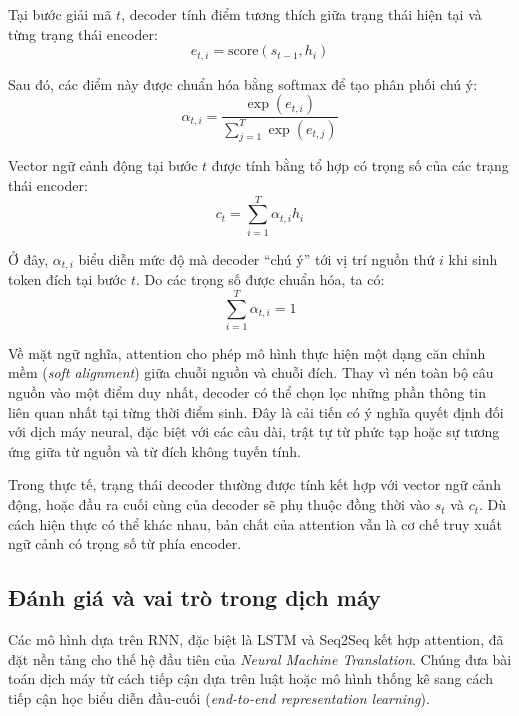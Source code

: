 \documentclass[a4paper,12pt,twoside]{report}
\begin{document}
Tại bước giải mã $t$, decoder tính điểm tương thích giữa trạng thái hiện tại và từng trạng thái encoder:
\begin{equation}
e_{t,i} = \text{score}(s_{t-1}, h_i)
\end{equation}

Sau đó, các điểm này được chuẩn hóa bằng softmax để tạo phân phối chú ý:
\begin{equation}
\alpha_{t,i} = \frac{\exp(e_{t,i})}{\sum_{j=1}^{T} \exp(e_{t,j})}
\end{equation}

Vector ngữ cảnh động tại bước $t$ được tính bằng tổ hợp có trọng số của các trạng thái encoder:
\begin{equation}
c_t = \sum_{i=1}^{T} \alpha_{t,i} h_i
\end{equation}

Ở đây, $\alpha_{t,i}$ biểu diễn mức độ mà decoder ``chú ý'' tới vị trí nguồn thứ $i$ khi sinh token đích tại bước $t$. Do các trọng số được chuẩn hóa, ta có:
\begin{equation}
\sum_{i=1}^{T} \alpha_{t,i} = 1
\end{equation}

Về mặt ngữ nghĩa, attention cho phép mô hình thực hiện một dạng căn chỉnh mềm (\textit{soft alignment}) giữa chuỗi nguồn và chuỗi đích. Thay vì nén toàn bộ câu nguồn vào một điểm duy nhất, decoder có thể chọn lọc những phần thông tin liên quan nhất tại từng thời điểm sinh. Đây là cải tiến có ý nghĩa quyết định đối với dịch máy neural, đặc biệt với các câu dài, trật tự từ phức tạp hoặc sự tương ứng giữa từ nguồn và từ đích không tuyến tính.

Trong thực tế, trạng thái decoder thường được tính kết hợp với vector ngữ cảnh động, hoặc đầu ra cuối cùng của decoder sẽ phụ thuộc đồng thời vào $s_t$ và $c_t$. Dù cách hiện thực có thể khác nhau, bản chất của attention vẫn là cơ chế truy xuất ngữ cảnh có trọng số từ phía encoder.

\subsection{Đánh giá và vai trò trong dịch máy}

Các mô hình dựa trên RNN, đặc biệt là LSTM và Seq2Seq kết hợp attention, đã đặt nền tảng cho thế hệ đầu tiên của \textit{Neural Machine Translation}. Chúng đưa bài toán dịch máy từ cách tiếp cận dựa trên luật hoặc mô hình thống kê sang cách tiếp cận học biểu diễn đầu-cuối (\textit{end-to-end representation learning}).
\end{document}

